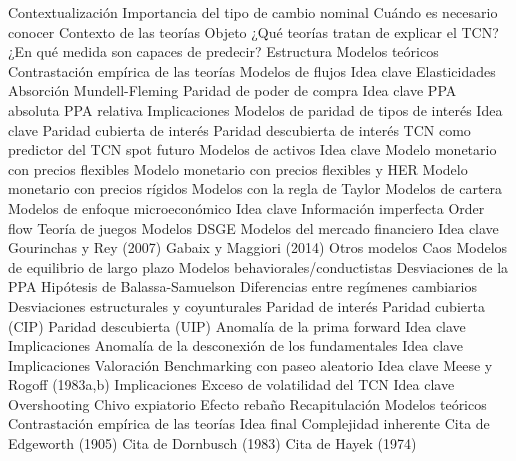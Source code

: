 \documentclass{nuevotema}
\begin{document}
\begin{esquema}[enumerate]
	\1[] 
		\2 Contextualización
			\3 Importancia del tipo de cambio nominal
			\3 Cuándo es necesario conocer
			\3 Contexto de las teorías
		\2 Objeto
			\3 ¿Qué teorías tratan de explicar el TCN?
			\3 ¿En qué medida son capaces de predecir?
		\2 Estructura
			\3 Modelos teóricos
			\3 Contrastación empírica de las teorías
	\1 
		\2 Modelos de flujos
			\3 Idea clave
			\3 Elasticidades
			\3 Absorción
			\3 Mundell-Fleming
		\2 Paridad de poder de compra
			\3 Idea clave
			\3 PPA absoluta
			\3 PPA relativa
			\3 Implicaciones
		\2 Modelos de paridad de tipos de interés
			\3 Idea clave
			\3 Paridad cubierta de interés
			\3 Paridad descubierta de interés
			\3 TCN como predictor del TCN spot futuro
		\2 Modelos de activos
			\3 Idea clave
			\3 Modelo monetario con precios flexibles
			\3 Modelo monetario con precios flexibles y HER
			\3 Modelo monetario con precios rígidos
			\3 Modelos con la regla de Taylor
			\3 Modelos de cartera
		\2 Modelos de enfoque microeconómico
			\3 Idea clave
			\3 Información imperfecta
			\3 Order flow
			\3 Teoría de juegos
			\3 Modelos DSGE
		\2 Modelos del mercado financiero
			\3 Idea clave
			\3 Gourinchas y Rey (2007)
			\3 Gabaix y Maggiori (2014)
		\2 Otros modelos
			\3 Caos
			\3 Modelos de equilibrio de largo plazo
			\3 Modelos behaviorales/conductistas
	\1 
		\2 Desviaciones de la PPA
			\3 Hipótesis de Balassa-Samuelson
			\3 Diferencias entre regímenes cambiarios
			\3 Desviaciones estructurales y coyunturales
		\2 Paridad de interés
			\3 Paridad cubierta (CIP)
			\3 Paridad descubierta (UIP)
		\2 Anomalía de la prima forward
			\3 Idea clave
			\3 Implicaciones
		\2 Anomalía de la desconexión de los fundamentales
			\3 Idea clave
			\3 Implicaciones
			\3 Valoración
		\2 Benchmarking con paseo aleatorio
			\3 Idea clave
			\3 Meese y Rogoff (1983a,b)
			\3 Implicaciones
		\2 Exceso de volatilidad del TCN
			\3 Idea clave
			\3 Overshooting
			\3 Chivo expiatorio
			\3 Efecto rebaño
	\1[] 
		\2 Recapitulación
			\3 Modelos teóricos
			\3 Contrastación empírica de las teorías
		\2 Idea final
			\3 Complejidad inherente
			\3 Cita de Edgeworth (1905)
			\3 Cita de Dornbusch (1983)
			\3 Cita de Hayek (1974)

\end{esquema}

\esquemalargo
\end{document}
